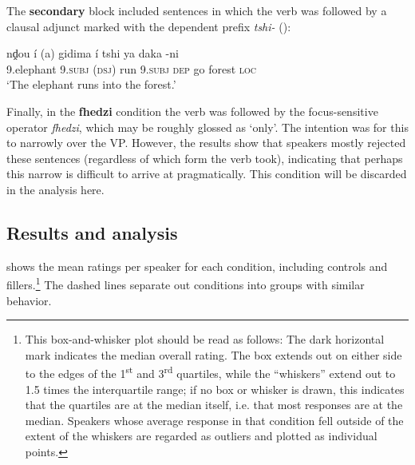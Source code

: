 \documentclass[output=paper 
,modfonts
,nonflat]{langsci/langscibook}
\begin{document}
The \textbf{secondary} block included sentences in which the verb was followed
by a clausal adjunct marked with the dependent prefix \textit{tshi-}
(\citealt{Warmelo1989}):


\ea \label{ex:kusmer:secondary}
\gll  nḓou í (a) gidima í tshi ya daka -ni\\
	9.elephant 9.\textsc{subj} (\textsc{dsj}) run 9.\textsc{subj} \textsc{dep}
	go forest \textsc{loc}\\
	\glt  `The elephant runs into the forest.'
 \z


Finally, in the \textbf{fhedzi} condition the verb was followed by the
focus-sensitive operator \textit{fhedzi}, which may be roughly glossed as
`only'. The intention was for this to narrowly  over the VP. However, the
results show that speakers mostly rejected these sentences (regardless of which
form the verb took), indicating that perhaps this narrow  is difficult to
arrive at pragmatically. This condition will be discarded in the
analysis here.


\subsection{Results and analysis}

 shows the mean ratings per speaker for each
condition, including controls and fillers.\footnote{This box-and-whisker plot
	should be read as follows: The dark horizontal mark indicates the median
	overall rating. The box extends out on either side to the edges of the
	1\textsuperscript{st} and 3\textsuperscript{rd} quartiles, while the
	``whiskers'' extend out to 1.5 times the interquartile range; if no box or
	whisker is drawn, this indicates that the quartiles are at the median
itself, i.e.  that most responses are at the median.  Speakers whose
average response in that condition fell  outside of the extent of the whiskers
are regarded as outliers and plotted as individual points.} The dashed lines
separate out conditions into groups with similar behavior.

\end{document}
